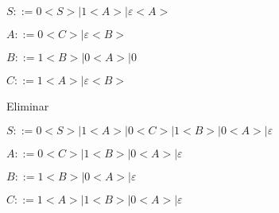 \documentclass[]{article}
\begin{document}
		$S::= 0<S> | 1<A> | \varepsilon<A>$
		
		$A::= 0<C> | \varepsilon <B>$
		
		$B::= 1<B> | 0<A> | 0$
		
		$C::= 1<A> | \varepsilon<B>$
		
		\begin{center}
		Eliminar
		\end{center}
		
		$S::= 0<S> | 1<A> | 0<C> |1<B> | 0 <A> | \varepsilon$
		
		$A::= 0<C> | 1<B> | 0 <A> | \varepsilon$
		
		$B::= 1<B> | 0 <A> | \varepsilon$
		
		$C::= 1<A> | 1<B> | 0<A> | \varepsilon$
		
\end{document}
